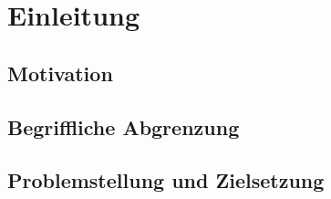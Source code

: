 \chapter{Einleitung}
\section{Motivation}
\blindtext

\section{Begriffliche Abgrenzung}
\blindtext

\section{Problemstellung und Zielsetzung}
\blindtext
